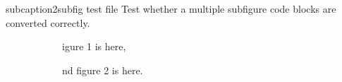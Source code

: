 subcaption2subfig test file
Test whether a multiple subfigure code blocks are converted correctly.

\begin{figure}
    \begin{subfigure}
        Figure 1 is here,
    \end{subfigure}
    \begin{subfigure}
        and figure 2 is here.
    \end{subfigure}
\end{figure}
